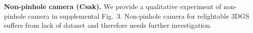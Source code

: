 \documentclass[10pt,twocolumn,letterpaper]{article}
\newcommand{\Rtwo}{\textcolor{rblue}{\textbf{Csak}}\xspace}
\newcommand{\myparagraph}[1]{\noindent\textbf{#1}}
\begin{document}
\myparagraph{Non-pinhole camera (\Rtwo).}
We provide a qualitative experiment of non-pinhole camera in supplemental Fig.~3. Non-pinhole camera for relightable 3DGS suffers from lack of dataset and therefore needs further investigation.


%     
%     
\end{document}
